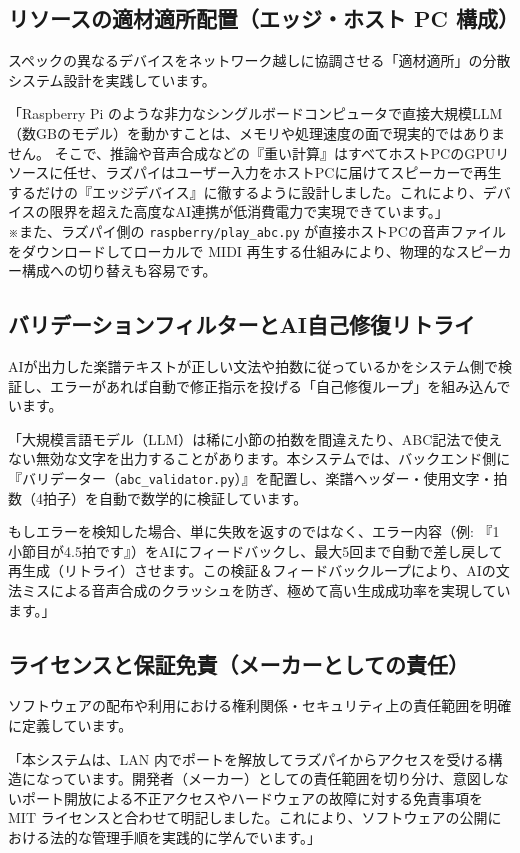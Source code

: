 \documentclass[a4paper,11pt]{jlreq}
\newcommand{\file}[1]{\texttt{\color{brand-green}#1}}
\begin{document}
\subsection{リソースの適材適所配置（エッジ・ホスト PC 構成）}

スペックの異なるデバイスをネットワーク越しに協調させる「適材適所」の分散システム設計を実践しています。
\begin{tcolorbox}[pointbox, title=アピール例: ラズパイの役割分担]
「Raspberry Pi のような非力なシングルボードコンピュータで直接大規模LLM（数GBのモデル）を動かすことは、メモリや処理速度の面で現実的ではありません。
そこで、推論や音声合成などの『重い計算』はすべてホストPCのGPUリソースに任せ、ラズパイはユーザー入力をホストPCに届けてスピーカーで再生するだけの『エッジデバイス』に徹するように設計しました。これにより、デバイスの限界を超えた高度なAI連携が低消費電力で実現できています。」
\\
※また、ラズパイ側の \file{raspberry/play\_abc.py} が直接ホストPCの音声ファイルをダウンロードしてローカルで MIDI 再生する仕組みにより、物理的なスピーカー構成への切り替えも容易です。
\end{tcolorbox}

\subsection{バリデーションフィルターとAI自己修復リトライ}

AIが出力した楽譜テキストが正しい文法や拍数に従っているかをシステム側で検証し、エラーがあれば自動で修正指示を投げる「自己修復ループ」を組み込んでいます。
\begin{tcolorbox}[pointbox, title=アピール例: AIへの自動差し戻し]
「大規模言語モデル（LLM）は稀に小節の拍数を間違えたり、ABC記法で使えない無効な文字を出力することがあります。本システムでは、バックエンド側に『バリデーター（\file{abc\_validator.py}）』を配置し、楽譜ヘッダー・使用文字・拍数（4拍子）を自動で数学的に検証しています。

もしエラーを検知した場合、単に失敗を返すのではなく、エラー内容（例: 『1小節目が4.5拍です』）をAIにフィードバックし、最大5回まで自動で差し戻して再生成（リトライ）させます。この検証＆フィードバックループにより、AIの文法ミスによる音声合成のクラッシュを防ぎ、極めて高い生成成功率を実現しています。」
\end{tcolorbox}

\subsection{ライセンスと保証免責（メーカーとしての責任）}

ソフトウェアの配布や利用における権利関係・セキュリティ上の責任範囲を明確に定義しています。
\begin{tcolorbox}[pointbox, title=アピール例: 免責事項の明記]
「本システムは、LAN 内でポートを解放してラズパイからアクセスを受ける構造になっています。開発者（メーカー）としての責任範囲を切り分け、意図しないポート開放による不正アクセスやハードウェアの故障に対する免責事項を MIT ライセンスと合わせて明記しました。これにより、ソフトウェアの公開における法的な管理手順を実践的に学んでいます。」
\end{tcolorbox}
\end{document}
